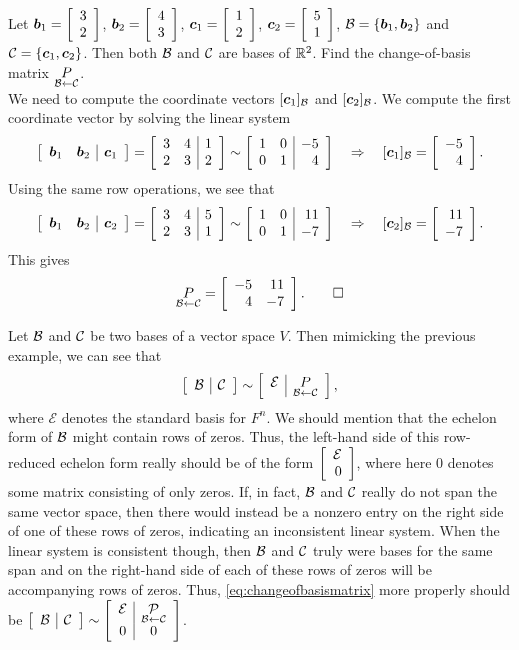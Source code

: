 \begin{Exam} Let $\bb b_1 = \vr{3\\2}$, $\bb b_2 = \vr{4\\3}$, $\bb c_1 = \vr{1\\2}$, $\bb c_2 = \vr{5\\1}$, $\B = \{\bb b_1, \bb b_2\}$ and $\c = \{\bb c_1, \bb c_2\}$. Then both $\B$ and $\c$ are bases of $\R^2$. Find the change-of-basis matrix $\underset{\B\leftarrow \c}{P}$.\\

We need to compute the coordinate vectors $[\bb c_1]_\B$ and $[\bb c_2]_\B$. 
We compute the first coordinate vector by solving the linear system
\[\mtx{rr|r}{\bb b_1 & \bb b_2 & \bb c_1} = \mtx{rr|r}{3&4&1\\2&3&2} \sim \mtx{rr|r}{1&0&-5\\0&1&4} \qRightarrow [\bb c_1]_\B = \vr{-5\\4}.\]
Using the same row operations, we see that \[\mtx{rr|r}{\bb b_1 & \bb b_2 & \bb c_2} = \mtx{rr|r}{3&4&5\\2&3&1} \sim \mtx{rr|r}{1&0&11\\0&1&-7} \qRightarrow [\bb c_2]_\B = \vr{11\\-7}.\] 
This gives
\[\underset{\B\leftarrow \c}{P} = \mtx{rr}{-5&11\\4&-7}.\qedhere\]
\end{Exam}\vs

Let $\B$ and $\c$ be two bases of a vector space $V$. Then mimicking the previous example, we can see that 
\begin{equation}\label{eq:changeofbasismatrix}\mtx{c|c}{\B & \c} \sim \mtx{c|c}{\mathcal{E} & \underset{\B\leftarrow \c}{P}},\end{equation} where $\mathcal{E}$ denotes the standard basis for $F^n$. We should mention that the echelon form of $\B$ might contain rows of zeros. Thus, the left-hand side of this row-reduced echelon form really should be of the form $\vr{\mathcal{E} \\ 0}$, where here $0$ denotes some matrix consisting of only zeros.   If, in fact, $\B$ and $\c$ really do not span the same vector space, then there would instead be a nonzero entry on the right side of one of these rows of zeros, indicating an inconsistent linear system. When the linear system is consistent though, then $\B$ and $\c$ truly were bases for the same span and on the right-hand side of each of these rows of zeros will be accompanying rows of zeros. Thus, \eqref{eq:changeofbasismatrix} more properly should be $\mtx{c|c}{\B & \c} \sim \mtx{c|c}{\mathcal{E} & \underset{\B\leftarrow \c}{\P} \\ 0 & 0}$.\\

